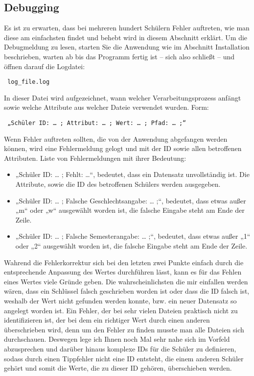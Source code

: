 \documentclass[a4paper,10pt]{scrartcl}
\begin{document}
   \subsection{Debugging}
   Es ist zu erwarten, dass bei mehreren hundert Schülern Fehler auftreten, wie man diese am einfachsten findet und behebt wird in diesem Abschnitt erklärt.
   Um die Debugmeldung zu lesen, starten Sie die Anwendung wie im Abschnitt Installation beschrieben, warten ab bis das Programm fertig ist – sich also schließt – und öffnen darauf die Logdatei:
   \begin{verbatim} log_file.log \end{verbatim}
   In dieser Datei wird aufgezeichnet, wann welcher Verarbeitungsprozess anfängt sowie welche Attribute aus welcher Dateie verwendet wurden. Form:
   \begin{verbatim} „Schüler ID: … ; Attribut: … ; Wert: … ; Pfad: … ;“ \end{verbatim}
   Wenn Fehler auftreten sollten, die von der Anwendung abgefangen werden können, wird eine Fehlermeldung gelogt und mit der ID sowie allen betroffenen Attributen. 
   Liste von Fehlermeldungen mit ihrer Bedeutung:
   \begin{itemize}
      \item „Schüler ID: … ; Fehlt: …“, bedeutet, dass ein Datensatz unvollständig ist. Die Attribute, sowie die ID des betroffenen Schülers werden ausgegeben.
      \item „Schüler ID: … ; Falsche Geschlechtsangabe: … ;“, bedeutet, dass etwas außer „m“ oder „w“ ausgewählt worden ist, die falsche Eingabe steht am Ende der Zeile.
      \item „Schüler ID: … ; Falsche Semesterangabe: … ;“, bedeutet, dass etwas außer „1“ oder „2“ ausgewählt worden ist, die falsche Eingabe steht am Ende der Zeile. 
   \end{itemize} 
   Wahrend die Fehlerkorrektur sich bei den letzten zwei Punkte einfach durch die entsprechende Anpassung des Wertes durchführen lässt, kann es für das Fehlen eines Wertes viele Gründe geben. Die wahrscheinlichsten die mir einfallen werden wären, dass ein Schlüssel falsch geschrieben worden ist oder dass die ID falsch ist, weshalb der Wert nicht gefunden werden konnte, bzw. ein neuer Datensatz so angelegt worden ist.
   \newline
   Ein Fehler, der bei sehr vielen Dateien praktisch nicht zu identifizieren ist, der bei dem ein richtiger Wert durch einen anderen überschrieben wird, denn um den Fehler zu finden musste man alle Dateien sich durchschauen. Deswegen lege ich Ihnen noch Mal sehr nahe sich im Vorfeld abzusprechen und darüber hinaus komplexe IDs für die Schüler zu definieren, sodass durch einen Tippfehler nicht eine ID entsteht, die einem anderen Schüler gehört und somit die Werte, die zu dieser ID gehören, überschieben werden.
\end{document}
